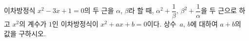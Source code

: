이차방정식 $x^2-3x+1=0$의 두 근을 $\alpha$, $\beta$라 할 때, $\alpha^2+\dfrac{1}{\beta}$, $\beta^2+\dfrac{1}{\alpha}$을 두 근으로 하고 $x^2$의 계수가 $1$인 이차방정식이 $x^2+ax+b=0$이다. 상수~$a$, $b$에 대하여 $a+b$의 값을 구하시오.
